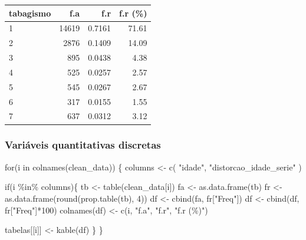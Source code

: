\documentclass[
]{article}
\newenvironment{Shaded}{\begin{snugshade}}{\end{snugshade}}
\newcommand{\ControlFlowTok}[1]{\textcolor[rgb]{0.00,0.23,0.31}{#1}}
\newcommand{\DecValTok}[1]{\textcolor[rgb]{0.68,0.00,0.00}{#1}}
\newcommand{\FunctionTok}[1]{\textcolor[rgb]{0.28,0.35,0.67}{#1}}
\newcommand{\NormalTok}[1]{\textcolor[rgb]{0.00,0.23,0.31}{#1}}
\newcommand{\OtherTok}[1]{\textcolor[rgb]{0.00,0.23,0.31}{#1}}
\newcommand{\SpecialCharTok}[1]{\textcolor[rgb]{0.37,0.37,0.37}{#1}}
\newcommand{\StringTok}[1]{\textcolor[rgb]{0.13,0.47,0.30}{#1}}
\begin{document}
\begin{longtable}[]{@{}lrrr@{}}
\toprule()
tabagismo & f.a & f.r & f.r (\%) \\
\midrule()
\endhead
1 & 14619 & 0.7161 & 71.61 \\
2 & 2876 & 0.1409 & 14.09 \\
3 & 895 & 0.0438 & 4.38 \\
4 & 525 & 0.0257 & 2.57 \\
5 & 545 & 0.0267 & 2.67 \\
6 & 317 & 0.0155 & 1.55 \\
7 & 637 & 0.0312 & 3.12 \\
\bottomrule()
\end{longtable}

\hypertarget{variuxe1veis-quantitativas-discretas}{%
\subsubsection{Variáveis quantitativas
discretas}\label{variuxe1veis-quantitativas-discretas}}

\begin{Shaded}
\begin{Highlighting}[]
\ControlFlowTok{for}\NormalTok{(i }\ControlFlowTok{in} \FunctionTok{colnames}\NormalTok{(clean\_data)) \{}
\NormalTok{  columns }\OtherTok{\textless{}{-}} \FunctionTok{c}\NormalTok{(}
    \StringTok{"idade"}\NormalTok{,}
    \StringTok{"distorcao\_idade\_serie"}
\NormalTok{  )}
  
  \ControlFlowTok{if}\NormalTok{(i }\SpecialCharTok{\%in\%}\NormalTok{ columns)\{}
\NormalTok{    tb }\OtherTok{\textless{}{-}} \FunctionTok{table}\NormalTok{(clean\_data[i])}
\NormalTok{    fa }\OtherTok{\textless{}{-}} \FunctionTok{as.data.frame}\NormalTok{(tb)}
\NormalTok{    fr }\OtherTok{\textless{}{-}} \FunctionTok{as.data.frame}\NormalTok{(}\FunctionTok{round}\NormalTok{(}\FunctionTok{prop.table}\NormalTok{(tb), }\DecValTok{4}\NormalTok{))}
\NormalTok{    df }\OtherTok{\textless{}{-}} \FunctionTok{cbind}\NormalTok{(fa, fr[}\StringTok{"Freq"}\NormalTok{])}
\NormalTok{    df }\OtherTok{\textless{}{-}} \FunctionTok{cbind}\NormalTok{(df, fr[}\StringTok{"Freq"}\NormalTok{]}\SpecialCharTok{*}\DecValTok{100}\NormalTok{)}
    \FunctionTok{colnames}\NormalTok{(df) }\OtherTok{\textless{}{-}} \FunctionTok{c}\NormalTok{(i, }\StringTok{"f.a"}\NormalTok{, }\StringTok{"f.r"}\NormalTok{, }\StringTok{"f.r (\%)"}\NormalTok{)}

\NormalTok{    tabelas[[i]] }\OtherTok{\textless{}{-}} \FunctionTok{kable}\NormalTok{(df)}
\NormalTok{  \}}
\NormalTok{\}}
\end{Highlighting}
\end{Shaded}
\end{document}
